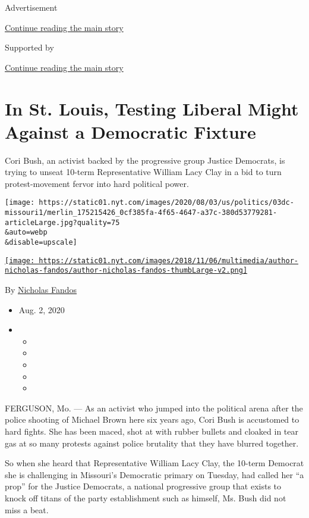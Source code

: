 Advertisement

\protect\hyperlink{after-top}{Continue reading the main story}

Supported by

\protect\hyperlink{after-sponsor}{Continue reading the main story}

\hypertarget{in-st-louis-testing-liberal-might-against-a-democratic-fixture}{%
\section{In St. Louis, Testing Liberal Might Against a Democratic
Fixture}\label{in-st-louis-testing-liberal-might-against-a-democratic-fixture}}

Cori Bush, an activist backed by the progressive group Justice
Democrats, is trying to unseat 10-term Representative William Lacy Clay
in a bid to turn protest-movement fervor into hard political power.

\texttt{[image: https://static01.nyt.com/images/2020/08/03/us/politics/03dc-missouri1/merlin\_175215426\_0cf385fa-4f65-4647-a37c-380d53779281-articleLarge.jpg?quality=75\\\&auto=webp\\\&disable=upscale]}

\href{https://www.nytimes.com/by/nicholas-fandos}{\texttt{[image: https://static01.nyt.com/images/2018/11/06/multimedia/author-nicholas-fandos/author-nicholas-fandos-thumbLarge-v2.png]}}

By \href{https://www.nytimes.com/by/nicholas-fandos}{Nicholas Fandos}

\begin{itemize}
\item
  Aug. 2, 2020
\item
  \begin{itemize}
  \item
  \item
  \item
  \item
  \item
  \end{itemize}
\end{itemize}

FERGUSON, Mo. --- As an activist who jumped into the political arena
after the police shooting of Michael Brown here six years ago, Cori Bush
is accustomed to hard fights. She has been maced, shot at with rubber
bullets and cloaked in tear gas at so many protests against police
brutality that they have blurred together.

So when she heard that Representative William Lacy Clay, the 10-term
Democrat she is challenging in Missouri's Democratic primary on Tuesday,
had called her ``a prop'' for the Justice Democrats, a national
progressive group that exists to knock off titans of the party
establishment such as himself, Ms. Bush did not miss a beat.

